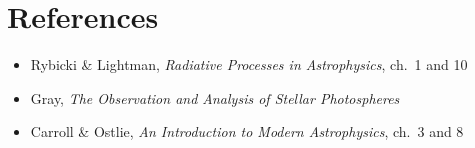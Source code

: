 \section*{References}
\begin{itemize}
\item Rybicki \& Lightman, \textit{Radiative Processes in Astrophysics}, ch.\ 1 and 10
\item Gray, \textit{The Observation and Analysis of Stellar Photospheres}
\item Carroll \& Ostlie, \textit{An Introduction to Modern Astrophysics}, ch.\ 3 and 8
\end{itemize}


